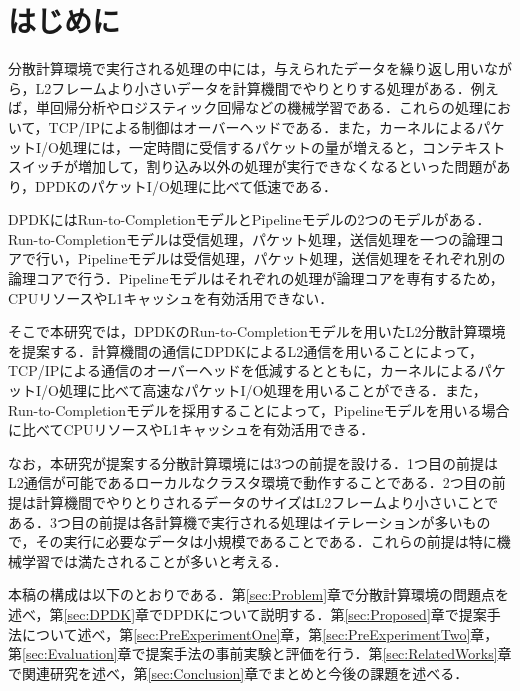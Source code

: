 \section{はじめに}
\label{sec:Background}
分散計算環境で実行される処理の中には，与えられたデータを繰り返し用いながら，L2フレームより小さいデータを計算機間でやりとりする処理がある．例えば，単回帰分析やロジスティック回帰などの機械学習である．これらの処理において，TCP/IPによる制御はオーバーヘッドである．また，カーネルによるパケットI/O処理には，一定時間に受信するパケットの量が増えると，コンテキストスイッチが増加して，割り込み以外の処理が実行できなくなるといった問題があり，DPDKのパケットI/O処理に比べて低速である．

DPDKにはRun-to-CompletionモデルとPipelineモデルの2つのモデルがある．Run-to-Completionモデルは受信処理，パケット処理，送信処理を一つの論理コアで行い，Pipelineモデルは受信処理，パケット処理，送信処理をそれぞれ別の論理コアで行う．Pipelineモデルはそれぞれの処理が論理コアを専有するため，CPUリソースやL1キャッシュを有効活用できない．

そこで本研究では，DPDKのRun-to-Completionモデルを用いたL2分散計算環境を提案する．計算機間の通信にDPDKによるL2通信を用いることによって，TCP/IPによる通信のオーバーヘッドを低減するとともに，カーネルによるパケットI/O処理に比べて高速なパケットI/O処理を用いることができる．また，Run-to-Completionモデルを採用することによって，Pipelineモデルを用いる場合に比べてCPUリソースやL1キャッシュを有効活用できる．

なお，本研究が提案する分散計算環境には3つの前提を設ける．1つ目の前提はL2通信が可能であるローカルなクラスタ環境で動作することである．2つ目の前提は計算機間でやりとりされるデータのサイズはL2フレームより小さいことである．3つ目の前提は各計算機で実行される処理はイテレーションが多いもので，その実行に必要なデータは小規模であることである．これらの前提は特に機械学習では満たされることが多いと考える．

本稿の構成は以下のとおりである．第\ref{sec:Problem}章で分散計算環境の問題点を述べ，第\ref{sec:DPDK}章でDPDKについて説明する．第\ref{sec:Proposed}章で提案手法について述べ，第\ref{sec:PreExperimentOne}章，第\ref{sec:PreExperimentTwo}章，第\ref{sec:Evaluation}章で提案手法の事前実験と評価を行う．第\ref{sec:RelatedWorks}章で関連研究を述べ，第\ref{sec:Conclusion}章でまとめと今後の課題を述べる．
